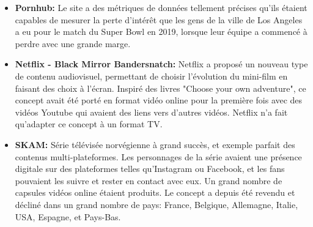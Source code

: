\begin{itemize}
    \item \textbf{Pornhub:} Le site a des métriques de données tellement précises qu'ils étaient capables de mesurer la perte d’intérêt que les gens de la ville de Los Angeles a eu pour le match du Super Bowl en 2019, lorsque leur équipe a commencé à perdre avec une grande marge.
    \item \textbf{Netflix - Black Mirror Bandersnatch:} Netflix a proposé un nouveau type de contenu audiovisuel, permettant de choisir l'évolution du mini-film en faisant des choix à l'écran. Inspiré des livres "Choose your own adventure", ce concept avait été porté en format vidéo online pour la première fois avec des vidéos Youtube qui avaient des liens vers d'autres vidéos. Netflix n'a fait qu'adapter ce concept à un format TV.
    \item \textbf{SKAM:} Série télévisée norvégienne à grand succès, et exemple parfait des contenus multi-plateformes. Les personnages de la série avaient une présence digitale sur des plateformes telles qu'Instagram ou Facebook, et les fans pouvaient les suivre et rester en contact avec eux. Un grand nombre de capsules vidéos online étaient produits. Le concept a depuis été revendu et décliné dans un grand nombre de pays: France, Belgique, Allemagne, Italie, USA, Espagne, et Pays-Bas.
\end{itemize}
